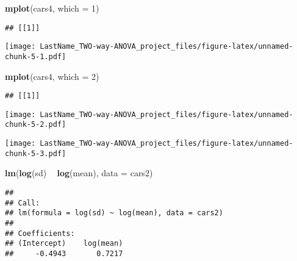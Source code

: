 \documentclass[]{article}
\newenvironment{Shaded}{\begin{snugshade}}{\end{snugshade}}
\newcommand{\DataTypeTok}[1]{\textcolor[rgb]{0.13,0.29,0.53}{#1}}
\newcommand{\DecValTok}[1]{\textcolor[rgb]{0.00,0.00,0.81}{#1}}
\newcommand{\KeywordTok}[1]{\textcolor[rgb]{0.13,0.29,0.53}{\textbf{#1}}}
\newcommand{\NormalTok}[1]{#1}
\newcommand{\OperatorTok}[1]{\textcolor[rgb]{0.81,0.36,0.00}{\textbf{#1}}}
\newcommand{\StringTok}[1]{\textcolor[rgb]{0.31,0.60,0.02}{#1}}
\begin{document}
\begin{Shaded}
\begin{Highlighting}[]
\KeywordTok{mplot}\NormalTok{(cars4, }\DataTypeTok{which =} \DecValTok{1}\NormalTok{)}
\end{Highlighting}
\end{Shaded}

\begin{verbatim}
## [[1]]
\end{verbatim}

\texttt{[image: LastName\_TWO-way-ANOVA\_project\_files/figure-latex/unnamed-chunk-5-1.pdf]}

\begin{Shaded}
\begin{Highlighting}[]
\KeywordTok{mplot}\NormalTok{(cars4, }\DataTypeTok{which =} \DecValTok{2}\NormalTok{)}
\end{Highlighting}
\end{Shaded}

\begin{verbatim}
## [[1]]
\end{verbatim}

\texttt{[image: LastName\_TWO-way-ANOVA\_project\_files/figure-latex/unnamed-chunk-5-2.pdf]}

\begin{Shaded}
\end{Shaded}

\texttt{[image: LastName\_TWO-way-ANOVA\_project\_files/figure-latex/unnamed-chunk-5-3.pdf]}

\begin{Shaded}
\begin{Highlighting}[]
\KeywordTok{lm}\NormalTok{(}\KeywordTok{log}\NormalTok{(sd) }\OperatorTok{~}\StringTok{ }\KeywordTok{log}\NormalTok{(mean), }\DataTypeTok{data =}\NormalTok{ cars2)}
\end{Highlighting}
\end{Shaded}

\begin{verbatim}
## 
## Call:
## lm(formula = log(sd) ~ log(mean), data = cars2)
## 
## Coefficients:
## (Intercept)    log(mean)  
##     -0.4943       0.7217
\end{verbatim}
\end{document}
